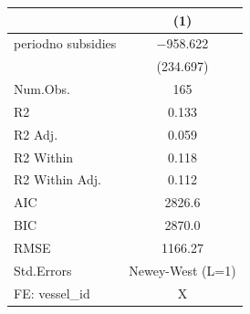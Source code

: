\begin{table}
\centering
\begin{tabular}[t]{lc}
\toprule
  & (1)\\
\midrule
periodno subsidies & \num{-958.622}\\
 & (\num{234.697})\\
\midrule
Num.Obs. & \num{165}\\
R2 & \num{0.133}\\
R2 Adj. & \num{0.059}\\
R2 Within & \num{0.118}\\
R2 Within Adj. & \num{0.112}\\
AIC & \num{2826.6}\\
BIC & \num{2870.0}\\
RMSE & \num{1166.27}\\
Std.Errors & Newey-West (L=1)\\
FE: vessel_id & X\\
\bottomrule
\end{tabular}
\end{table}
